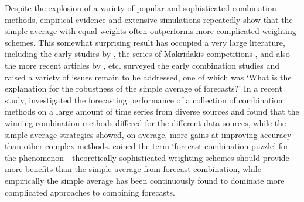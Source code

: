 \documentclass[11pt]{article}
\begin{document}
Despite the explosion of a variety of popular and sophisticated combination methods, empirical evidence and extensive simulations repeatedly show that the simple average with equal weights often outperforms more complicated weighting schemes. This somewhat surprising result has occupied a very large literature, including the early studies by \cite{Stock1998-np,Stock2003-sp,Stock2004-rq}, the series of Makridakis competitions \citep{Makridakis1982-hb,Makridakis2000-he,Makridakis2020-hu}, and also the more recent articles by \cite{Blanc2016-sn,Blanc2020-pg}, etc. \cite{Clemen1989-fb} surveyed the early combination studies and raised a variety of issues remain to be addressed, one of which was `What is the explanation for the robustness of the simple average of forecasts?' In a recent study, \cite{Gastinger2021-ey} investigated the forecasting performance of a collection of combination methods on a large amount of time series from diverse sources and found that the winning combination methods differed for the different data sources, while the simple average strategies showed, on average, more gains at improving accuracy than other complex methods. \cite{Stock2004-rq} coined the term `forecast combination puzzle' for the phenomenon---theoretically sophisticated weighting schemes should provide more benefits than the simple average from forecast combination, while empirically the simple average has been continuously found to dominate more complicated approaches to combining forecasts.
\end{document}
